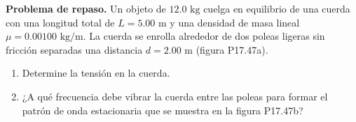 \item \textbf{Problema de repaso.}
Un objeto de $12.0\text{ kg}$ cuelga en equilibrio de una cuerda con una longitud total de $L = 5.00\text{ m}$ y una densidad de masa lineal $\mu = 0.00100\text{ kg/m}$. La cuerda se enrolla alrededor de dos poleas ligeras sin fricción separadas una distancia $d = 2.00\text{ m}$ (figura P17.47a).
\begin{enumerate}
    \item Determine la tensión en la cuerda.
    \item ¿A qué frecuencia debe vibrar la cuerda entre las poleas para formar el patrón de onda estacionaria que se muestra en la figura P17.47b?
\end{enumerate}